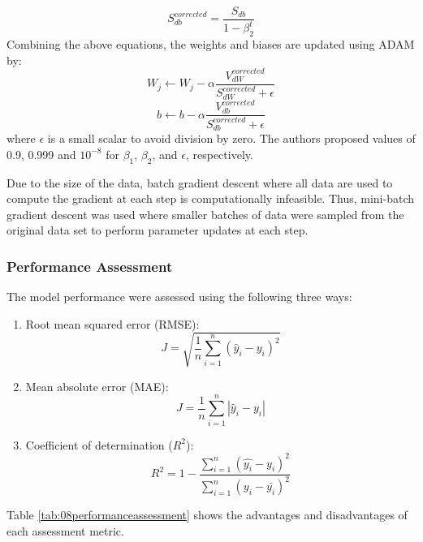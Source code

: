 \begin{equation}
    S_{db}^{corrected} = \frac{S_{db}}{1 - \beta_2^t}
\end{equation}
Combining the above equations, the weights and biases are updated using ADAM by:
\begin{equation}
    W_j \leftarrow W_j - \alpha \frac{V_{dW}^{corrected}}{S_{dW}^{corrected} + \epsilon}
\end{equation}
\begin{equation}
    b \leftarrow b - \alpha \frac{V_{db}^{corrected}}{S_{db}^{corrected} + \epsilon}
\end{equation}
where $\epsilon$ is a small scalar to avoid division by zero. The authors proposed values of 0.9, 0.999 and $10^{-8}$ for $\beta_1$, $\beta_2$, and $\epsilon$, respectively.

Due to the size of the data, batch gradient descent where all data are used to compute the gradient at each step is computationally infeasible.  Thus, mini-batch gradient descent was used where smaller batches of data were sampled from the original data set to perform parameter updates at each step.

\subsubsection{Performance Assessment}
The model performance were assessed using the following three ways:
\begin{enumerate}
    \item Root mean squared error (RMSE):
    \begin{equation}
        J = \sqrt{\frac{1}{n}\sum\limits^n_{i=1}(\hat{y}_i - y_i)^2}
        \label{eq:08RMSE}
    \end{equation}
    
    \item Mean absolute error (MAE):
    \begin{equation}
        J = \frac{1}{n}\sum\limits^n_{i=1}|\hat{y}_i - y_i|
        \label{eq:08MSE}
    \end{equation}
    \item Coefficient of determination ($R^2$):
    \begin{equation}
        R^2 = 1 - \frac{\sum\limits^n_{i = 1}(\hat{y_i} - y_i)^2}{\sum\limits^n_{i = 1}(y_i - \bar{y_i})^2}
    \end{equation}
\end{enumerate}

Table \ref{tab:08performanceassessment} shows the advantages and disadvantages of each assessment metric.

